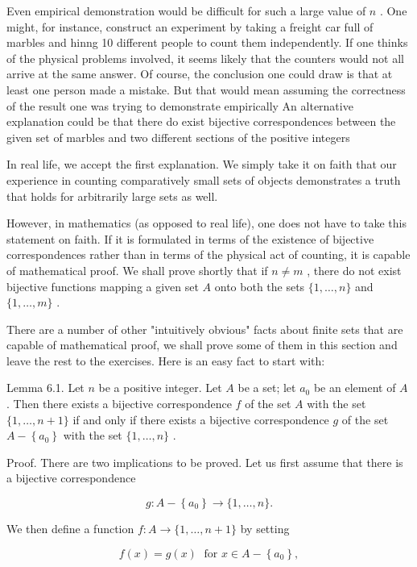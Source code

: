 \documentclass[10pt]{article}
\begin{document}
Even empirical demonstration would be difficult for such a large value of \(n\) . One might, for instance, construct an experiment by taking a freight car full of marbles and hinng 10 different people to count them independently. If one thinks of the physical problems involved, it seems likely that the counters would not all arrive at the same answer. Of course, the conclusion one could draw is that at least one person made a mistake. But that would mean assuming the correctness of the result one was trying to demonstrate empirically An alternative explanation could be that there do exist bijective correspondences between the given set of marbles and two different sections of the positive integers

In real life, we accept the first explanation. We simply take it on faith that our experience in counting comparatively small sets of objects demonstrates a truth that holds for arbitrarily large sets as well.

However, in mathematics (as opposed to real life), one does not have to take this statement on faith. If it is formulated in terms of the existence of bijective correspondences rather than in terms of the physical act of counting, it is capable of mathematical proof. We shall prove shortly that if \(n \neq  m\) , there do not exist bijective functions mapping a given set \(A\) onto both the sets \(\{ 1,\ldots ,n\}\) and \(\{ 1,\ldots ,m\}\) .

There are a number of other "intuitively obvious" facts about finite sets that are capable of mathematical proof, we shall prove some of them in this section and leave the rest to the exercises. Here is an easy fact to start with:

Lemma 6.1. Let \(n\) be a positive integer. Let \(A\) be a set; let \({a}_{0}\) be an element of \(A\) . Then there exists a bijective correspondence \(f\) of the set \(A\) with the set \(\{ 1,\ldots ,n + 1\}\) if and only if there exists a bijective correspondence \(g\) of the set \(A - \left\{  {a}_{0}\right\}\) with the set \(\{ 1,\ldots ,n\}\) .

Proof. There are two implications to be proved. Let us first assume that there is a bijective correspondence

\[
g : A - \left\{  {a}_{0}\right\}   \rightarrow  \{ 1,\ldots ,n\} .
\]

We then define a function \(f : A \rightarrow  \{ 1,\ldots ,n + 1\}\) by setting

\[
f\left( x\right)  = g\left( x\right) \;\text{ for }x \in  A - \left\{  {a}_{0}\right\}  ,
\]
\end{document}
